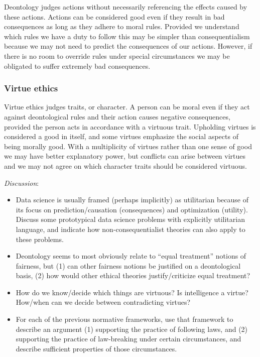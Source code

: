 \documentclass[]{book}
\providecommand{\tightlist}{%
  \setlength{\itemsep}{0pt}\setlength{\parskip}{0pt}}
\theoremstyle{definition}
\theoremstyle{definition}
\theoremstyle{definition}
\theoremstyle{remark}
\begin{document}
Deontology judges actions without necessarily referencing the effects
caused by these actions. Actions can be considered good even if they
result in bad consequences as long as they adhere to moral rules.
Provided we understand which rules we have a duty to follow this may be
simpler than consequentialism because we may not need to predict the
consequences of our actions. However, if there is no room to override
rules under special circumstances we may be obligated to suffer
extremely bad consequences.

\subsubsection{Virtue ethics}\label{virtue-ethics}

Virtue ethics judges traits, or character. A person can be moral even if
they act against deontological rules and their action causes negative
consequences, provided the person acts in accordance with a virtuous
trait. Upholding virtues is considered a good in itself, and some
virtues emphasize the social aspects of being morally good. With a
multiplicity of virtues rather than one sense of good we may have better
explanatory power, but conflicts can arise between virtues and we may
not agree on which character traits should be considered virtuous.

\emph{Discussion}:

\begin{itemize}
\tightlist
\item
  Data science is usually framed (perhaps implicitly) as utilitarian
  because of its focus on prediction/causation (consequences) and
  optimization (utility). Discuss some prototypical data science
  problems with explicitly utilitarian language, and indicate how
  non-consequentialist theories can also apply to these problems.
\item
  Deontology seems to most obviously relate to ``equal treatment''
  notions of fairness, but (1) can other fairness notions be justified
  on a deontological basis, (2) how would other ethical theories
  justify/criticize equal treatment?
\item
  How do we know/decide which things are virtuous? Is intelligence a
  virtue? How/when can we decide between contradicting virtues?
\item
  For each of the previous normative frameworks, use that framework to
  describe an argument (1) supporting the practice of following laws,
  and (2) supporting the practice of law-breaking under certain
  circumstances, and describe sufficient properties of those
  circumstances.
\end{itemize}
\end{document}

